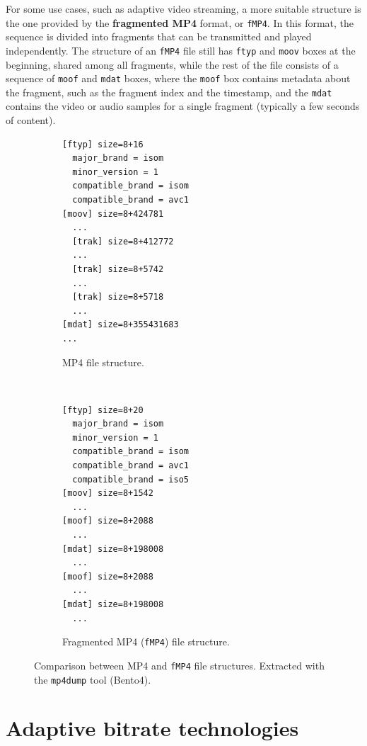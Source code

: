 For some use cases, such as adaptive video streaming, a more suitable structure is the one provided by the \textbf{fragmented MP4} format, or \texttt{fMP4}. In this format, the sequence is divided into fragments that can be transmitted and played independently. The structure of an \texttt{fMP4} file still has \texttt{ftyp} and \texttt{moov} boxes at the beginning, shared among all fragments, while the rest of the file consists of a sequence of \texttt{moof} and \texttt{mdat} boxes, where the \texttt{moof} box contains metadata about the fragment, such as the fragment index and the timestamp, and the \texttt{mdat} contains the video or audio samples for a single fragment (typically a few seconds of content).

\begin{figure}
	\centering
	
	\begin{subfigure}[t]{0.45\textwidth}
		\centering
		\begin{verbatim}
[ftyp] size=8+16
  major_brand = isom
  minor_version = 1
  compatible_brand = isom
  compatible_brand = avc1
[moov] size=8+424781
  ...
  [trak] size=8+412772
  ...
  [trak] size=8+5742
  ...
  [trak] size=8+5718
  ...
[mdat] size=8+355431683
...
		\end{verbatim}
		\caption{MP4 file structure.}
		\label{fig:mp4dump_progressive}
	\end{subfigure}%
	~ 
	\begin{subfigure}[t]{0.45\textwidth}
		\centering
		\begin{verbatim}
[ftyp] size=8+20
  major_brand = isom
  minor_version = 1
  compatible_brand = isom
  compatible_brand = avc1
  compatible_brand = iso5
[moov] size=8+1542
  ...
[moof] size=8+2088
  ...
[mdat] size=8+198008
  ...
[moof] size=8+2088
  ...
[mdat] size=8+198008
  ...
		\end{verbatim}
		\caption{Fragmented MP4 (\texttt{fMP4}) file structure.}
		\label{fig:mp4dump_fragmented}
	\end{subfigure}
	
	\caption{Comparison between MP4 and \texttt{fMP4} file structures. Extracted with the \texttt{mp4dump} tool (Bento4).}
	\label{fig:mp4dump}
\end{figure}


\section{Adaptive bitrate technologies}
\label{sec:bg/abr}


